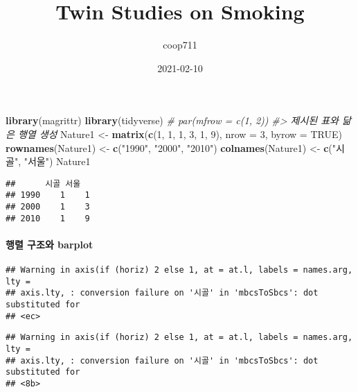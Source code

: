 \documentclass[
]{article}
\title{Twin Studies on Smoking}
\author{coop711}
\date{2021-02-10}
\newenvironment{Shaded}{\begin{snugshade}}{\end{snugshade}}
\newcommand{\CommentTok}[1]{\textcolor[rgb]{0.56,0.35,0.01}{\textit{#1}}}
\newcommand{\DataTypeTok}[1]{\textcolor[rgb]{0.13,0.29,0.53}{#1}}
\newcommand{\DecValTok}[1]{\textcolor[rgb]{0.00,0.00,0.81}{#1}}
\newcommand{\KeywordTok}[1]{\textcolor[rgb]{0.13,0.29,0.53}{\textbf{#1}}}
\newcommand{\NormalTok}[1]{#1}
\newcommand{\OperatorTok}[1]{\textcolor[rgb]{0.81,0.36,0.00}{\textbf{#1}}}
\newcommand{\OtherTok}[1]{\textcolor[rgb]{0.56,0.35,0.01}{#1}}
\newcommand{\StringTok}[1]{\textcolor[rgb]{0.31,0.60,0.02}{#1}}
\begin{document}
\maketitle

\begin{Shaded}
\begin{Highlighting}[]
\KeywordTok{library}\NormalTok{(magrittr)}
\KeywordTok{library}\NormalTok{(tidyverse)}
\CommentTok{# par(mfrow = c(1, 2))}
\CommentTok{#> 제시된 표와 닮은 행열 생성}
\NormalTok{Nature1 <-}\StringTok{ }\KeywordTok{matrix}\NormalTok{(}\KeywordTok{c}\NormalTok{(}\DecValTok{1}\NormalTok{, }\DecValTok{1}\NormalTok{, }\DecValTok{1}\NormalTok{, }\DecValTok{3}\NormalTok{, }\DecValTok{1}\NormalTok{, }\DecValTok{9}\NormalTok{), }
                  \DataTypeTok{nrow =} \DecValTok{3}\NormalTok{, }\DataTypeTok{byrow =} \OtherTok{TRUE}\NormalTok{)}
\KeywordTok{rownames}\NormalTok{(Nature1) <-}\StringTok{ }\KeywordTok{c}\NormalTok{(}\StringTok{"1990"}\NormalTok{, }\StringTok{"2000"}\NormalTok{, }\StringTok{"2010"}\NormalTok{)}
\KeywordTok{colnames}\NormalTok{(Nature1) <-}\StringTok{ }\KeywordTok{c}\NormalTok{(}\StringTok{"시골"}\NormalTok{, }\StringTok{"서울"}\NormalTok{)}
\NormalTok{Nature1}
\end{Highlighting}
\end{Shaded}

\begin{verbatim}
##      시골 서울
## 1990    1    1
## 2000    1    3
## 2010    1    9
\end{verbatim}

\hypertarget{uxd589uxb82c-uxad6cuxc870uxc640-barplot}{%
\paragraph{행렬 구조와
barplot}\label{uxd589uxb82c-uxad6cuxc870uxc640-barplot}}

\begin{Shaded}
\end{Shaded}

\begin{verbatim}
## Warning in axis(if (horiz) 2 else 1, at = at.l, labels = names.arg, lty =
## axis.lty, : conversion failure on '시골' in 'mbcsToSbcs': dot substituted for
## <ec>
\end{verbatim}

\begin{verbatim}
## Warning in axis(if (horiz) 2 else 1, at = at.l, labels = names.arg, lty =
## axis.lty, : conversion failure on '시골' in 'mbcsToSbcs': dot substituted for
## <8b>
\end{verbatim}
\end{document}
